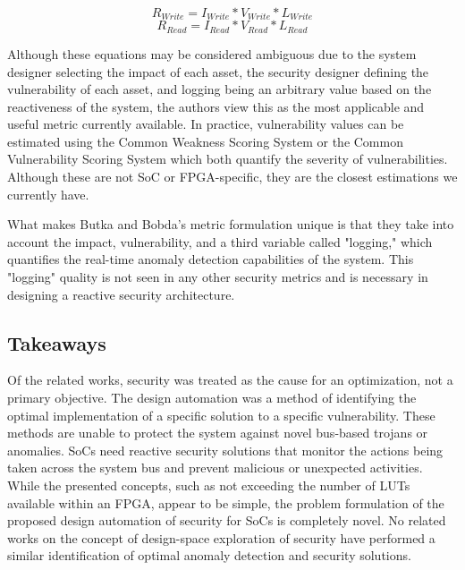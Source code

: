 \begin{equation}
\label{eq:ZTARiskWrite}
R_{Write} = I_{Write} * V_{Write}*L_{Write} 
\end{equation}
\begin{equation}
\label{eq:ZTARiskRead}
R_{Read} = I_{Read} * V_{Read}*L_{Read}
\end{equation}

Although these equations may be considered ambiguous due to the system designer selecting the impact of each asset, the security designer defining the vulnerability of each asset, and logging being an arbitrary value based on the reactiveness of the system, the authors view this as the most applicable and useful metric currently available. In practice, vulnerability values can be estimated using the Common Weakness Scoring System \cite{mitre_cwe_2014} or the Common Vulnerability Scoring System \cite{first_cvss_2023} which both quantify the severity of vulnerabilities. Although these are not SoC or FPGA-specific, they are the closest estimations we currently have.

What makes Butka and Bobda's metric formulation unique is that they take into account the impact, vulnerability, and a third variable called "logging," which quantifies the real-time anomaly detection capabilities of the system. This "logging" quality is not seen in any other security metrics and is necessary in designing a reactive security architecture. 

\subsection{Takeaways}

Of the related works, security was treated as the cause for an optimization, not a primary objective. The design automation was a method of identifying the optimal implementation of a specific solution to a specific vulnerability. These methods are unable to protect the system against novel bus-based trojans or anomalies. SoCs need reactive security solutions that monitor the actions being taken across the system bus and prevent malicious or unexpected activities. 
While the presented concepts, such as not exceeding the number of LUTs available within an FPGA, appear to be simple, the problem formulation of the proposed design automation of security for SoCs is completely novel. No related works on the concept of design-space exploration of security have performed a similar identification of optimal anomaly detection and security solutions.


